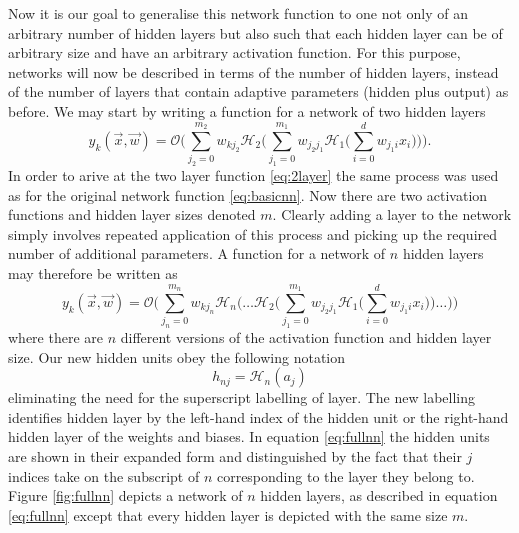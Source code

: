 \par Now it is our goal to generalise this network function to one not only of
an arbitrary number of hidden layers but also such that each hidden layer can be
of arbitrary size and have an arbitrary activation function. For this purpose,
networks will now be described in terms of the number of hidden layers, instead
of the number of layers that contain adaptive parameters (hidden plus output) as
before. We may start by writing a function for a network of two hidden layers
\begin{equation}
y_k(\vec{x},\vec{w}) = \mathcal{O} \Bigg( \sum_{j_{2}=0}^{m_{2}} w_{kj_{2}} \mathcal{H}_{2} 
\Bigg( \sum_{j_{1}=0}^{m_{1}} w_{j_{2}j_{1}} \mathcal{H}_{1} \Bigg( \sum_{i=0}^{d} w_{j_{1}i} x_{i} \Bigg) \Bigg) \Bigg).
\label{eq:2layer}
\end{equation}
In order to arive at the two layer function \eqref{eq:2layer} the same process
was used as for the original network function \eqref{eq:basicnn}. Now there are
two activation functions and hidden layer sizes denoted $m$. Clearly adding a
layer to the network simply involves repeated application of this process and
picking up the required number of additional parameters. A function for a
network of $n$ hidden layers may therefore be written as
\begin{equation}
y_k(\vec{x},\vec{w}) = \mathcal{O} \Bigg( \sum_{j_{n}=0}^{m_{n}} w_{kj_{n}}
\mathcal{H}_{n} \Bigg( \dots \mathcal{H}_2  \Bigg( \sum_{j_{1}=0}^{m_{1}} w_{j_{2}j_{1}} 
\mathcal{H}_{1} \Bigg( \sum_{i=0}^{d} w_{j_{1}i} x_{i} \Bigg) \Bigg) \dots \Bigg) \Bigg)
\label{eq:fullnn}
\end{equation}
where there are $n$ different versions of the activation function and hidden
layer size. Our new hidden units obey the following notation
\begin{equation}
h_{nj} = \mathcal{H}_n(a_j)
\label{eq:newhiddenunits}
\end{equation}
eliminating the need for the superscript labelling of layer. The new labelling
identifies hidden layer by the left-hand index of the hidden unit or the
right-hand hidden layer of the weights and biases. In equation \eqref{eq:fullnn}
the hidden units are shown in their expanded form and distinguished by the fact
that their $j$ indices take on the subscript of $n$ corresponding to the layer
they belong to. Figure \ref{fig:fullnn} depicts a network of $n$ hidden layers,
as described in equation \eqref{eq:fullnn} except that every hidden layer is
depicted with the same size $m$.

